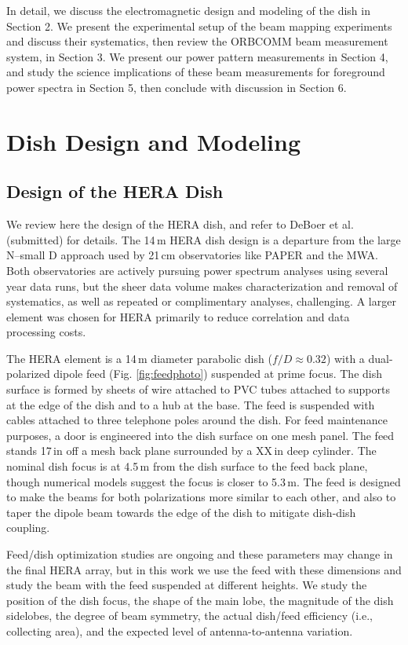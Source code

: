 \documentclass{emulateapj}
\begin{document}
In detail, we discuss the electromagnetic design and modeling of the dish in Section 2. We present the 
experimental setup of the beam mapping experiments and discuss their systematics, then 
review the ORBCOMM beam measurement system, in Section 3. We present our power pattern 
measurements in Section 4, and study the science implications of these beam measurements for foreground power spectra in Section 5, then conclude with discussion in Section 6.

\section{Dish Design and Modeling}

\subsection{Design of the HERA Dish}

We review here the design of the HERA dish, and refer to DeBoer et al. (submitted) for details. 
The 14\,m HERA dish design is a departure from the large N--small D approach used by 21\,cm 
observatories like PAPER and the MWA. Both observatories are actively pursuing power 
spectrum analyses using several year data runs, but the sheer data volume makes 
characterization and removal of systematics, as well as repeated or complimentary analyses, 
challenging. A larger element was chosen for HERA primarily to reduce correlation and data processing costs. 

The HERA element is a 14\,m diameter parabolic dish ($f/D\approx0.32$) with a dual-polarized dipole feed (Fig. \ref{fig:feedphoto}) suspended at prime focus. The dish surface is formed by sheets of wire attached to PVC tubes attached to supports at the edge of the dish and to a hub at the base. The feed is suspended with cables attached to three telephone poles around the dish. For feed maintenance purposes, a door is engineered into the dish surface on one mesh panel. The feed stands 17\,in off a mesh back plane surrounded by a XX\,in deep cylinder. The nominal dish focus is at 4.5\,m from the dish surface to the feed back plane, though numerical models suggest the focus is closer to 5.3\,m. The feed is designed to make the beams for both polarizations more similar to each other, and also to taper the dipole beam towards the edge of the dish to mitigate dish-dish coupling. 

Feed/dish optimization studies are ongoing and these parameters may change in the final HERA array, but in this work we use the feed with these dimensions and study the beam with the feed suspended at different heights. We study the position of the dish focus, the shape of the main lobe, the magnitude of the dish sidelobes, the degree of beam symmetry, the actual dish/feed efficiency (i.e., collecting area), and the expected level of antenna-to-antenna variation.
\end{document}
